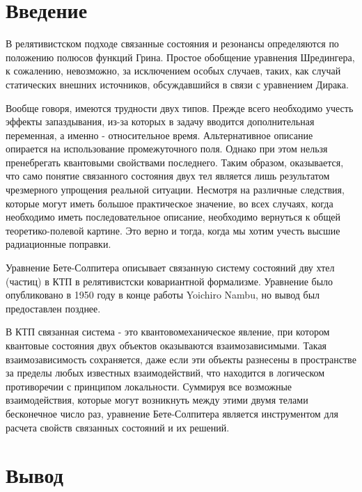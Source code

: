 \documentclass[a4paper,14pt,russian]{article}
\renewcommand\contentsname{Projects List} %
\begin{document}
\renewcommand\contentsname{Оглавление}
\tableofcontents
\vspace{\fill}

\newpage

\section{Введение} 

В релятивистском подходе связанные состояния и резонансы определяются по положению полюсов функций Грина. Простое обобщение уравнения Шредингера, к сожалению, невозможно, за исключением особых случаев, таких, как случай статических внешних источников, обсуждавшийся в связи с уравнением Дирака.

Вообще говоря, имеются трудности двух типов. Прежде всего необходимо учесть эффекты запаздывания, из-за которых в задачу вводится дополнительная переменная, а именно - относительное время. Альтернативное описание опирается на использование промежуточного поля. Однако при этом нельзя пренебрегать квантовыми свойствами последнего. Таким образом, оказывается, что само понятие связанного состояния двух тел является лишь результатом чрезмерного упрощения реальной ситуации. Несмотря на различные следствия, которые могут иметь большое практическое значение, во всех случаях, когда необходимо иметь последовательное описание, необходимо вернуться к общей теоретико-полевой картине. Это верно и тогда, когда мы хотим учесть высшие радиационные поправки.

Уравнение Бете-Солпитера описывает связанную систему состояний дву хтел (частиц) в КТП в  релятивистски ковариантной формализме. Уравнение было опубликовано в 1950 году в конце работы Yoichiro Nambu, но вывод был предоставлен позднее.

В КТП связанная система - это квантовомеханическое явление, при котором квантовые состояния двух объектов оказываются взаимозависимыми. Такая взаимозависимость сохраняется, даже если эти объекты разнесены в пространстве за пределы любых известных взаимодействий, что находится в логическом противоречии с принципом локальности. Суммируя все возможные взаимодействия, которые могут возникнуть между этими двумя телами бесконечное число раз, уравнение Бете-Солпитера является инструментом для расчета свойств связанных состояний и их решений.

\section{Вывод} 
\end{document}
